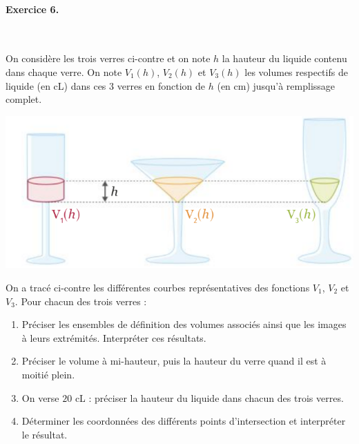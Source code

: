\documentclass[11pt]{article}
\begin{document}
\paragraph{Exercice 6.}~\\[-3mm]
\begin{minipage}{.5\textwidth}
  On considère les trois verres ci-contre et on note $h$ la hauteur du liquide
  contenu dans chaque verre. On note $V_1(h)$, $V_2(h)$ et $V_3(h)$ les volumes
  respectifs de liquide (en cL) dans ces $3$ verres en fonction de $h$ (en cm)
  jusqu'à remplissage complet.
\end{minipage}
\begin{minipage}{.5\textwidth}
  \begin{center}
\includegraphics[scale=.3]{verres.png}
  \end{center}
\end{minipage}
\begin{minipage}{.65\textwidth}
  On a tracé ci-contre les différentes courbes représentatives des fonctions
  $V_1$, $V_2$ et $V_3$. Pour chacun des trois verres :
  \begin{enumerate}
    \item Préciser les ensembles de définition des volumes associés ainsi que
      les images à leurs extrémités. Interpréter ces résultats.
    \item Préciser le volume à mi-hauteur, puis la hauteur du verre quand il est
      à moitié plein.
    \item On verse $20$ cL : préciser la hauteur du liquide dans chacun des
      trois verres.
    \item Déterminer les coordonnées des différents points d'intersection et
      interpréter le résultat.
  \end{enumerate}
\end{minipage}
\end{document}

